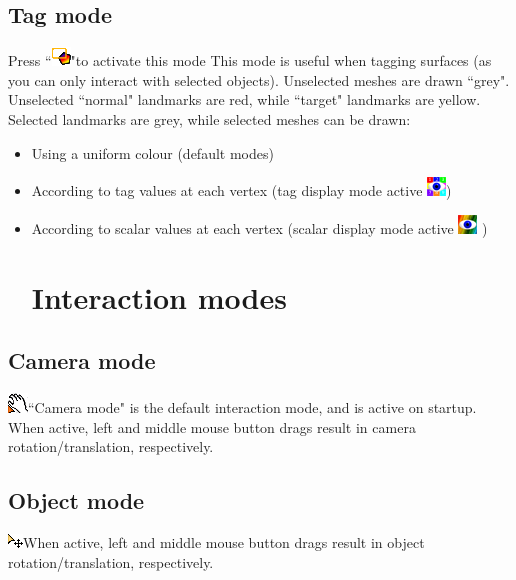 \subsection{Tag mode}
Press ``\includegraphics[scale=0.7]{images/pixmap/Tag_select_mode.png}"to activate this mode
This mode is useful when tagging surfaces (as you can only interact with selected objects). Unselected meshes are drawn ``grey".  Unselected ``normal" landmarks are red, while ``target" landmarks are yellow. Selected landmarks are grey, while selected meshes can be drawn:
\begin{itemize}
\item	Using a uniform colour (default modes)
\item According to tag values at each vertex (tag display mode active \includegraphics[scale=0.7]{images/pixmap/Show_Tag_Window.png})
\item	According to scalar values at each vertex (scalar display mode active \includegraphics[scale=0.7]{images/pixmap/show_color_scale.png} )
\section{Interaction modes}
\end{itemize}

\subsection{Camera mode}
  \includegraphics[scale=0.7]{images/pixmap/move.png}``Camera mode" is the default interaction mode, and is active on startup. When active, left and middle mouse button drags result in camera rotation/translation, respectively.
\subsection{Object mode}
   \includegraphics[scale=0.7]{images/pixmap/move_mode2.png}When active, left and middle mouse button drags result in object rotation/translation, respectively.
